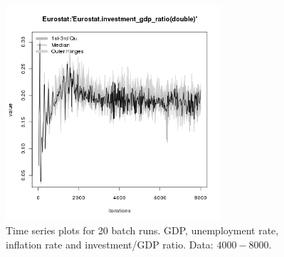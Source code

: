 \begin{figure}[ht!]
\begin{minipage}{17cm}
\includegraphics[width=8cm]{./transient/tax_0.05/Eurostat-investment_gdp_ratio.png}
\end{minipage}
\caption{Time series plots for 20 batch runs. GDP, unemployment rate, inflation rate and investment/GDP ratio. Data: $4000-8000$.}
\label{Figure: transient time}
\end{figure}


